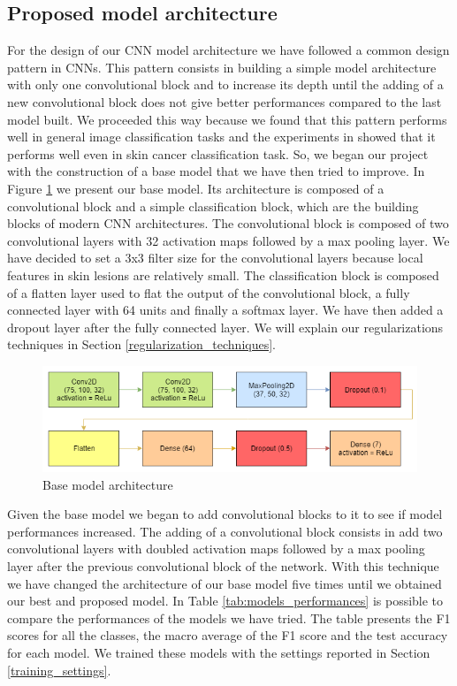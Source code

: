 	\subsection{Proposed model architecture}
	
		For the design of our CNN model architecture we have followed a common design pattern in CNNs. This pattern consists in building a simple model architecture with only one convolutional block and to increase its depth until the adding of a new convolutional block does not give better performances compared to the last model built. We proceeded this way because we found that this pattern performs well in general image classification tasks and the experiments in \cite{article3} showed that it performs well even in skin cancer classification task. So, we began our project with the construction of a base model that we have then tried to improve. In Figure \ref{fig:base_model} we present our base model. Its architecture is composed of a convolutional block and a simple classification block, which are the building blocks of modern CNN architectures. The convolutional block is composed of two convolutional layers with 32 activation maps followed by a max pooling layer. We have decided to set a 3x3 filter size for the convolutional layers because local features in skin lesions are relatively small. The classification block is composed of a flatten layer used to flat the output of the convolutional block, a fully connected layer with 64 units and finally a softmax layer. We have then added a dropout layer after the fully connected layer. We will explain our regularizations techniques in Section \ref{regularization_techniques}. 
		
		\begin{figure}[H]
			\centering
			\includegraphics[width=15cm]{images/base_model.png}
			\caption{Base model architecture}
			\label{fig:base_model}
		\end{figure}
	
		Given the base model we began to add convolutional blocks to it to see if model performances increased. The adding of a convolutional block consists in add two convolutional layers with doubled activation maps followed by a max pooling layer after the previous convolutional block of the network. With this technique we have changed the architecture of our base model five times until we obtained our best and proposed model. In Table \ref{tab:models_performances} is possible to compare the performances of the models we have tried. The table presents the F1 scores for all the classes, the macro average of the F1 score and the test accuracy for each model. We trained these models with the settings reported in Section \ref{training_settings}.
		
